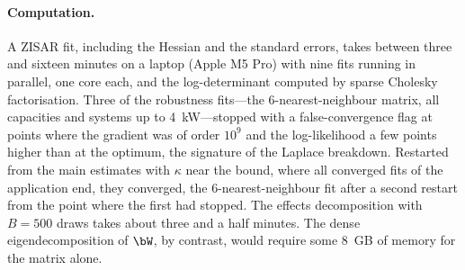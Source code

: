 \paragraph{Computation.}
A ZISAR fit, including the Hessian and the standard errors, takes between three and sixteen minutes on a laptop (Apple M5 Pro) with nine fits running in parallel, one core each, and the log-determinant computed by sparse Cholesky factorisation.
Three of the robustness fits---the 6-nearest-neighbour matrix, all capacities and systems up to 4~kW---stopped with a false-convergence flag at points where the gradient was of order $10^9$ and the log-likelihood a few points higher than at the optimum, the signature of the Laplace breakdown.
Restarted from the main estimates with $\kappa$ near the bound, where all converged fits of the application end, they converged, the 6-nearest-neighbour fit after a second restart from the point where the first had stopped.
The effects decomposition with $B = 500$ draws takes about three and a half minutes.
The dense eigendecomposition of $\bW$, by contrast, would require some 8~GB of memory for the matrix alone.
